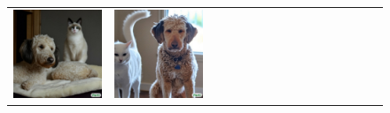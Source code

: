 \begin{figure}
\begin{adjustwidth}{-0.8in}{-0.5in}
\begin{tabular}{cccccccccccccccccccc}
\multicolumn{3}{c}{\includegraphics[width=\twobytwocolwidth\textwidth]{figures/limitations/labra_cat1.jpg}} &
\multicolumn{3}{c}{\includegraphics[width=\twobytwocolwidth\textwidth]{figures/limitations/labra_cat4.jpg}} &&

\end{tabular}
\end{adjustwidth}
\end{figure}
